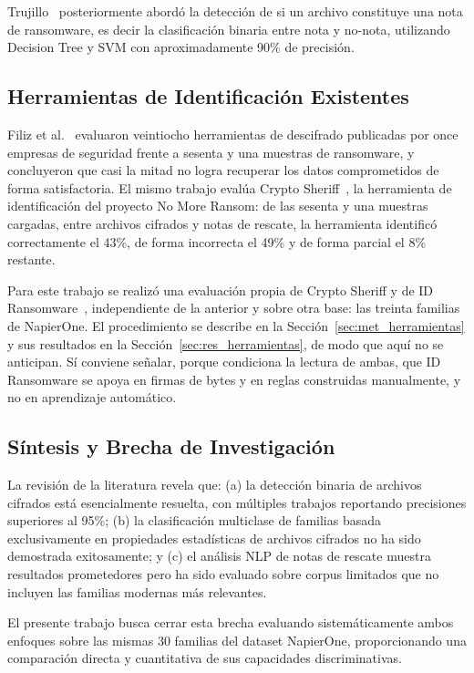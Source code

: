Trujillo~\cite{paper_8_supervised} posteriormente abordó la detección de si un archivo constituye una nota de ransomware, es decir la clasificación binaria entre nota y no-nota, utilizando Decision Tree y SVM con aproximadamente 90\% de precisión.

\subsection{Herramientas de Identificación Existentes}

Filiz et al.~\cite{paper_2_on_efectiveness} evaluaron veintiocho herramientas de descifrado publicadas por once empresas de seguridad frente a sesenta y una muestras de ransomware, y concluyeron que casi la mitad no logra recuperar los datos comprometidos de forma satisfactoria. El mismo trabajo evalúa Crypto Sheriff~\cite{cryptosheriff}, la herramienta de identificación del proyecto No More Ransom: de las sesenta y una muestras cargadas, entre archivos cifrados y notas de rescate, la herramienta identificó correctamente el 43\%, de forma incorrecta el 49\% y de forma parcial el 8\% restante.

Para este trabajo se realizó una evaluación propia de Crypto Sheriff y de ID Ransomware~\cite{idransomware}, independiente de la anterior y sobre otra base: las treinta familias de NapierOne. El procedimiento se describe en la Sección~\ref{sec:met_herramientas} y sus resultados en la Sección~\ref{sec:res_herramientas}, de modo que aquí no se anticipan. Sí conviene señalar, porque condiciona la lectura de ambas, que ID Ransomware se apoya en firmas de bytes y en reglas construidas manualmente, y no en aprendizaje automático.

\subsection{Síntesis y Brecha de Investigación}

La revisión de la literatura revela que: (a) la detección binaria de archivos cifrados está esencialmente resuelta, con múltiples trabajos reportando precisiones superiores al 95\%; (b) la clasificación multiclase de familias basada exclusivamente en propiedades estadísticas de archivos cifrados no ha sido demostrada exitosamente; y (c) el análisis NLP de notas de rescate muestra resultados prometedores pero ha sido evaluado sobre corpus limitados que no incluyen las familias modernas más relevantes.

El presente trabajo busca cerrar esta brecha evaluando sistemáticamente ambos enfoques sobre las mismas 30 familias del dataset NapierOne, proporcionando una comparación directa y cuantitativa de sus capacidades discriminativas.
